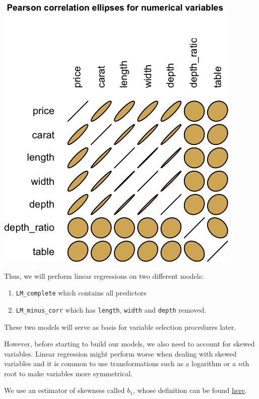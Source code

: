 \documentclass[
  paper=a4,
  ,captions=tableheading
]{scrartcl}
\providecommand{\tightlist}{%
  \setlength{\itemsep}{0pt}\setlength{\parskip}{0pt}}
\begin{document}
\begin{center}\includegraphics{Diamonds_PDF_files/figure-latex/uncorrelated-ellipses-1} \end{center}

Thus, we will perform linear regressions on two different models:

\begin{enumerate}
\def\labelenumi{\arabic{enumi}.}
\tightlist
\item
  \texttt{LM\_complete} which contains all predictors
\item
  \texttt{LM\_minus\_corr} which has \texttt{length}, \texttt{width} and
  \texttt{depth} removed.
\end{enumerate}

These two models will serve as basis for variable selection procedures
later.

However, before starting to build our models, we also need to account
for skewed variables. Linear regression might perform worse when dealing
with skewed variables and it is common to use transformations such as a
logarithm or a \(n\)th root to make variables more symmetrical.

We use an estimator of skewness called \(b_1\), whose definition can be
found
\href{https://en.wikipedia.org/wiki/Skewness\#Sample_skewness}{here}.
\end{document}
